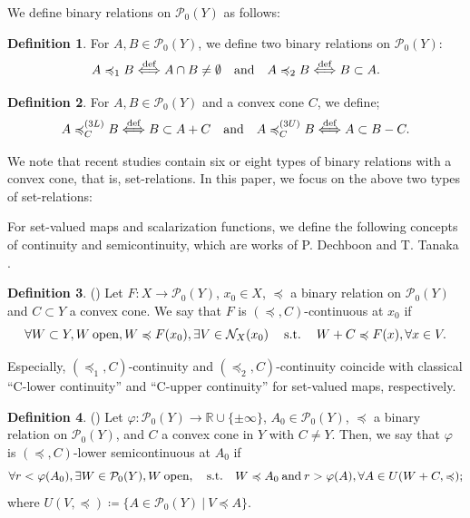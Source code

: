 \documentclass[a4paper,11pt]{jsarticle}
\theoremstyle{definition}
\newtheorem{dfn}{Definition}[section]
\newcommand{\RealNumberSet}{\mathbb{R}}
\newcommand{\SuchThat}{\quad\text{s.t.}\quad}
\newcommand{\pow}[1]{\mathcal{P}_{0}(#1)}
\newcommand{\SetForm}[2]{
  \{{#1}\:|\:{#2}\}
}
\begin{document}
We define binary relations on $\pow{Y}$ as follows:

\begin{dfn}
  For $A,B \in \pow{Y}$, we define two binary relations on $\pow{Y}$:
  \begin{equation}
    A \preccurlyeq_1 B \overset{\text{def}}{\Longleftrightarrow} A \cap B \ne \emptyset \quad \text{and} \quad A \preccurlyeq_2 B \overset{\text{def}}{\Longleftrightarrow} B \subset A. \notag
  \end{equation}
\end{dfn}

\begin{dfn}
  For $A,B \in \pow{Y}$ and a convex cone $C$, we define;
  \begin{equation}
    A \preccurlyeq_{C}^{(3L)} B \overset{\text{def}}{\Longleftrightarrow} B \subset A + C
    \quad \text{and} \quad A \preccurlyeq_{C}^{(3U)} B \overset{\text{def}}{\Longleftrightarrow} A \subset B -C. \notag
  \end{equation}
\end{dfn}

We note that recent studies contain six or eight types of binary relations with a convex cone, that is, set-relations.
In this paper, we focus on the above two types of set-relations:

For set-valued maps and scalarization functions, we define the following concepts of continuity and semicontinuity,
which are works of P. Dechboon and T. Tanaka \cite{DechboonTanaka2024}.

\begin{dfn}{(\cite{DechboonTanaka2024})}
  Let $F \colon X \to \pow{Y}$, $x_0 \in X$, $\preccurlyeq$ a binary relation on $\pow{Y}$
  and $C \subset Y$ a convex cone. We say that $F$ is $(\preccurlyeq, C)$-continuous at $x_0$ if
  \begin{equation}
    \forall W \subset Y, W\:\text{open},W \preccurlyeq F(x_0), \exists V \in \mathcal{N}_{X}(x_0) \:\SuchThat\: W + C \preccurlyeq F(x), \forall x \in V. \notag
  \end{equation}
\end{dfn}

Especially, $(\preccurlyeq_1, C)$-continuity and $(\preccurlyeq_2, C)$-continuity coincide with classical “C-lower
continuity” and “C-upper continuity” for set-valued maps, respectively.

\begin{dfn}{(\cite{DechboonTanaka2024})}
  Let $\varphi \colon \pow{Y} \to \RealNumberSet \cup \{\pm \infty\}$, $A_0 \in \pow{Y}$,
  $\preccurlyeq$ a binary relation on $\pow{Y}$, and $C$ a convex cone in $Y$ with $C \ne Y$. Then,
  we say that $\varphi$ is $(\preccurlyeq, C)$-lower semicontinuous at $A_0$ if
  \begin{equation}
    \forall r < \varphi (A_0), \exists W \in \pow{Y}, W\:\text{open}, \SuchThat W \preccurlyeq A_0 \:\text{and}\:
    r > \varphi (A), \forall A \in U(W + C, \preccurlyeq); \notag
  \end{equation}
  where $U(V,\preccurlyeq) \coloneqq \SetForm{A \in \pow{Y}}{V \preccurlyeq A}$.
\end{dfn}
\end{document}
